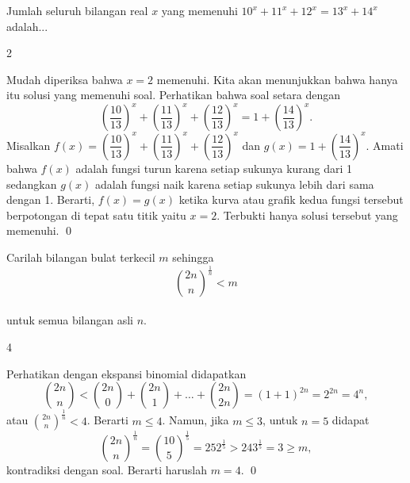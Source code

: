 \documentclass[11pt]{scrartcl}
\begin{document}
	\begin{soalbaru}
		Jumlah seluruh bilangan real $x$ yang memenuhi $10^x+11^x+12^x=13^x+14^x$ adalah... %
		\begin{jawaban}
		2
		\end{jawaban}
		\begin{solusi}
		Mudah diperiksa bahwa $x=2$ memenuhi. Kita akan menunjukkan bahwa hanya itu solusi yang memenuhi soal. Perhatikan bahwa soal setara dengan $$\left(\dfrac{10}{13}\right)^x+\left(\dfrac{11}{13}\right)^x+\left(\dfrac{12}{13}\right)^x=1+\left(\dfrac{14}{13}\right)^x.$$ Misalkan $f(x)=\left(\dfrac{10}{13}\right)^x+\left(\dfrac{11}{13}\right)^x+\left(\dfrac{12}{13}\right)^x$ dan $g(x)=1+\left(\dfrac{14}{13}\right)^x.$ Amati bahwa $f(x)$ adalah fungsi turun karena setiap sukunya kurang dari 1 sedangkan $g(x)$ adalah fungsi naik karena setiap sukunya lebih dari sama dengan 1. Berarti, $f(x)=g(x)$ ketika kurva atau grafik kedua fungsi tersebut berpotongan di tepat satu titik yaitu $x=2$. Terbukti hanya solusi tersebut yang memenuhi. \qed
		\end{solusi}
	\end{soalbaru}
	\vspace{10pt}
	\begin{soalbaru}
		Carilah bilangan bulat terkecil $m$ sehingga\\[-15pt] $${2n \choose n}^{\frac{1}{n}}<m$$\\[-20pt] untuk semua bilangan asli $n$.%
		
		\begin{jawaban}
		4
		\end{jawaban}
		\begin{solusi}
		Perhatikan dengan ekspansi binomial didapatkan $${2n \choose n} < {2n \choose 0}+{2n \choose 1}+\dots+{2n \choose 2n}=(1+1)^{2n}=2^{2n}=4^n,$$
		atau ${2n \choose n}^{\frac{1}{n}} < 4$. Berarti $m \le 4$. Namun, jika $m \le 3$, untuk $n=5$ didapat $${2n \choose n}^{\frac{1}{n}}={10 \choose 5}^{\frac{1}{5}}=252^{\frac{1}{5}} > 243^{\frac{1}{5}} = 3 \ge m,$$ kontradiksi dengan soal. Berarti haruslah $m=4$. \qed
		\end{solusi}
	\end{soalbaru}
	
\end{document}
